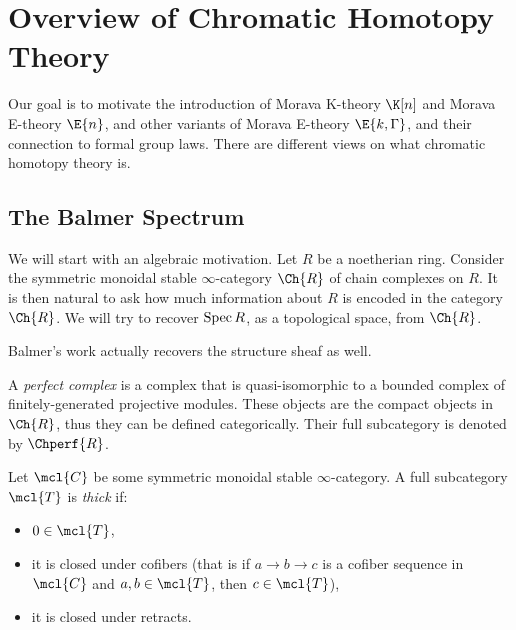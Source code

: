 \section{Overview of Chromatic Homotopy Theory}

Our goal is to motivate the introduction of Morava K-theory $\K[n]$ and Morava E-theory $\E{n}$, and other variants of Morava E-theory $\E{k,\Gamma}$, and their connection to formal group laws.
There are different views on what chromatic homotopy theory is.



\subsection{The Balmer Spectrum}

We will start with an algebraic motivation.
Let $R$ be a noetherian ring.
Consider the symmetric monoidal stable $\infty$-category $\Ch{R}$ of chain complexes on $R$. 
It is then natural to ask how much information about $R$ is encoded in the category $\Ch{R}$.
We will try to recover $\operatorname{Spec} R$, as a topological space, from $\Ch{R}$.

\begin{remark}
	Balmer's work actually recovers the structure sheaf as well. 
\end{remark}

\begin{definition}
	A \emph{perfect complex} is a complex that is quasi-isomorphic to a bounded complex of finitely-generated projective modules.
	These objects are the compact objects in $\Ch{R}$, thus they can be defined categorically.
	Their full subcategory is denoted by $\Chperf{R}$.
\end{definition}

\begin{definition}
	Let $\mcl{C}$ be some symmetric monoidal stable $\infty$-category.
	A full subcategory $\mcl{T}$ is \emph{thick} if:
	\begin{itemize}
		\item $0 \in \mcl{T}$,
		\item it is closed under cofibers (that is if $a \to b \to c$ is a cofiber sequence in $\mcl{C}$ and $a, b \in \mcl{T}$, then $c \in \mcl{T}$),
		\item it is closed under retracts.
	\end{itemize}
\end{definition}

